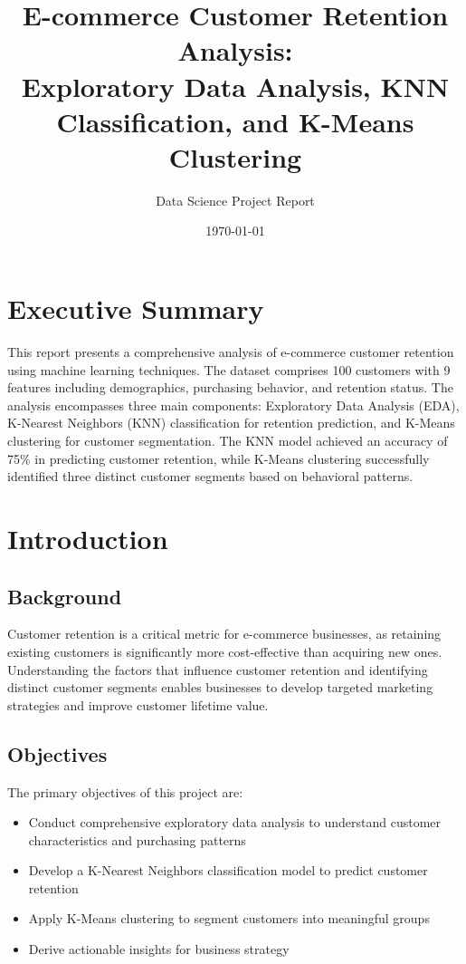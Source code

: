 \documentclass[12pt,a4paper]{article}
\title{\textbf{E-commerce Customer Retention Analysis:\\Exploratory Data Analysis, KNN Classification, and K-Means Clustering}}
\author{Data Science Project Report}
\date{\today}
\begin{document}
\maketitle
\newpage

\tableofcontents
\newpage

\section{Executive Summary}
This report presents a comprehensive analysis of e-commerce customer retention using machine learning techniques. The dataset comprises 100 customers with 9 features including demographics, purchasing behavior, and retention status. The analysis encompasses three main components: Exploratory Data Analysis (EDA), K-Nearest Neighbors (KNN) classification for retention prediction, and K-Means clustering for customer segmentation. The KNN model achieved an accuracy of 75\% in predicting customer retention, while K-Means clustering successfully identified three distinct customer segments based on behavioral patterns.

\section{Introduction}

\subsection{Background}
Customer retention is a critical metric for e-commerce businesses, as retaining existing customers is significantly more cost-effective than acquiring new ones. Understanding the factors that influence customer retention and identifying distinct customer segments enables businesses to develop targeted marketing strategies and improve customer lifetime value.

\subsection{Objectives}
The primary objectives of this project are:
\begin{itemize}
    \item Conduct comprehensive exploratory data analysis to understand customer characteristics and purchasing patterns
    \item Develop a K-Nearest Neighbors classification model to predict customer retention
    \item Apply K-Means clustering to segment customers into meaningful groups
    \item Derive actionable insights for business strategy
\end{itemize}
\end{document}
